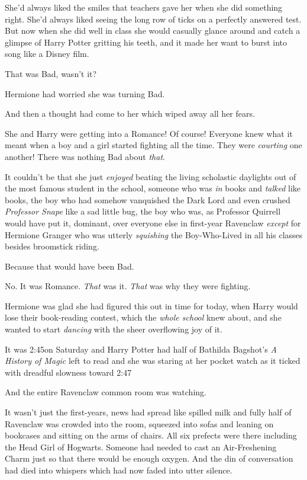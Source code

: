 She’d always liked the smiles that teachers gave her when she did something right. She’d always liked seeing the long row of ticks on a perfectly answered test. But now when she did well in class she would casually glance around and catch a glimpse of Harry Potter gritting his teeth, and it made her want to burst into song like a Disney film.

That was Bad, wasn’t it?

Hermione had worried she was turning Bad.

And then a thought had come to her which wiped away all her fears.

She and Harry were getting into a Romance! Of course! Everyone knew what it meant when a boy and a girl started fighting all the time. They were \emph{courting} one another! There was nothing Bad about \emph{that}.

It couldn’t be that she just \emph{enjoyed} beating the living scholastic daylights out of the most famous student in the school, someone who was \emph{in} books and \emph{talked} like books, the boy who had somehow vanquished the Dark Lord and even crushed \emph{Professor Snape} like a sad little bug, the boy who was, as Professor Quirrell would have put it, dominant, over everyone else in first-year Ravenclaw \emph{except} for Hermione Granger who was utterly \emph{squishing} the Boy-Who-Lived in all his classes besides broomstick riding.

Because that would have been Bad.

No. It was Romance. \emph{That} was it. \emph{That} was why they were fighting.

Hermione was glad she had figured this out in time for today, when Harry would lose their book-reading contest, which the \emph{whole school} knew about, and she wanted to start \emph{dancing} with the sheer overflowing joy of it.

It was 2:45\pm on Saturday and Harry Potter had half of Bathilda Bagshot’s \emph{A History of Magic} left to read and she was staring at her pocket watch as it ticked with dreadful slowness toward 2:47\pm

And the entire Ravenclaw common room was watching.

It wasn’t just the first-years, news had spread like spilled milk and fully half of Ravenclaw was crowded into the room, squeezed into sofas and leaning on bookcases and sitting on the arms of chairs. All six prefects were there including the Head Girl of Hogwarts. Someone had needed to cast an Air-Freshening Charm just so that there would be enough oxygen. And the din of conversation had died into whispers which had now faded into utter silence.

